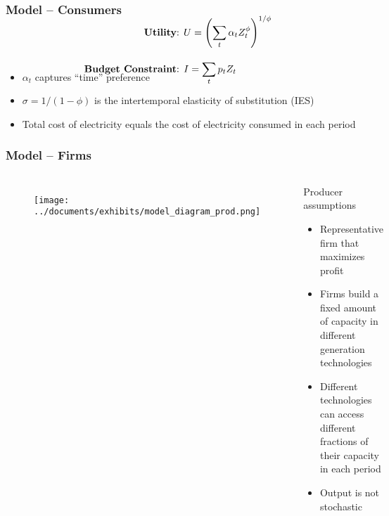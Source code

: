 \documentclass[aspectratio=169]{beamer}
\begin{document}
\begin{frame}
\frametitle{Model -- Consumers}


\vspace{1em}
\begin{block}{}
	\small
	\begin{align*}
	\\[-3em] \text{\textbf{Utility}: } &U = \left( \sum_t \alpha_t Z_t^\phi  \right)^{1/\phi} \\[1em]
	\text{\textbf{Budget Constraint}: } &I = \sum_t p_t Z_t \\[-2.5em]
	\end{align*}
\end{block}

\begin{itemize}
	\setlength\itemsep{0.5em}
	\small
	\item $\alpha_t$ captures ``time'' preference 
	\item  $\sigma = 1/(1-\phi)$ is the intertemporal elasticity of substitution (IES) 
	\item Total cost of electricity equals the cost of electricity consumed in each period
\end{itemize}

\end{frame}



\begin{frame}
\frametitle{Model -- Firms}


\begin{columns}[T]%
	
	\begin{figure}
		\texttt{[image: ../documents/exhibits/model\_diagram\_prod.png]} 
	\end{figure}
	
	\begin{block}{Producer assumptions}
		\begin{itemize}
			\setlength\itemsep{0.25em}
			\item Representative firm that maximizes profit
			\item Firms build a fixed amount of capacity in different generation technologies
			\item Different technologies can access different fractions of their capacity in each period
			\item Output is not stochastic
		\end{itemize}
	\end{block}
		
\end{columns}




\end{frame}
\end{document}
